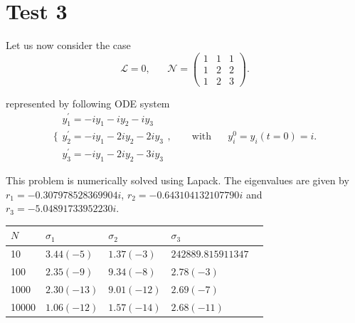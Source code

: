 \documentclass[10pt]{article}
\begin{document}
\newpage
\section{Test 3}

Let us now consider the case
\begin{equation}
\mathcal{L} = 0, \hspace{20pt}
\mathcal{N} = \left(
\begin{matrix}
 1   & 1 & 1 \\
 1   & 2 & 2 \\
 1   & 2 & 3 
\end{matrix}
\right).
\end{equation}

represented by following ODE system
\begin{equation}
  \Bigg\lbrace
\begin{matrix}
 y_1^{\prime} = -i y_1 -i y_2 - iy_3  \\
 y_2^{\prime} = -i y_1 -2i y_2 - 2iy_3  \\
 y_3^{\prime} = -i y_1 -2i y_2 - 3iy_3  
\end{matrix}, \hspace{20pt}\mbox{ with}\hspace{20pt} y_{i}^0 = y_i(t=0) = i.
\label{eqn:test3}
\end{equation}

This problem is numerically solved using Lapack. The eigenvalues are given by
$r_1 = -0.307978528369904i$, $r_2 = -0.643104132107790i$ and 
$r_3 = -5.04891733952230i$.


\begin{table}[!ht]
    \centering
    \begin{tabular}{|l|l|l|l|l|}
    \hline
        $N$ & $\sigma_1$  & $\sigma_2$  & $\sigma_3$         \\ \hline
        10 & $3.44(-5)$   & $1.37(-3)$  & $242889.815911347$ \\ \hline
        100 & $2.35(-9)$  & $9.34(-8)$  & $2.78(-3)$     \\ \hline
        1000 & $2.30(-13)$  & $9.01(-12)$ & $2.69(-7)$   \\ \hline
        10000 & $1.06(-12)$ & $1.57(-14)$ & $2.68(-11)$  \\ \hline
    \end{tabular}
\end{table}






\newpage
 
 
\end{document}
